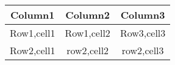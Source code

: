 \documentclass{article}
\begin{document}
\begin{table}[h]
	\centering
	\begin{tabular}{|c|c|c|}
		\hline
		\textbf{Column1} & \textbf{Column2} & \textbf{Column3}\\
		\hline
		Row1,cell1 & Row1,cell2 & Row3,cell3\\
		\hline
		Row2,cell1 & row2,cell2& row2,cell3\\
		\hline
		
	\end{tabular}
	
\end{table}
\end{document}
